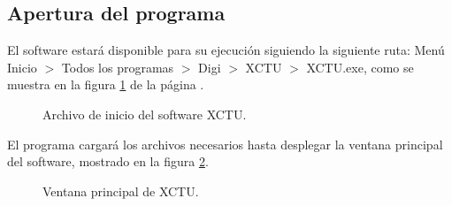 \subsection{Apertura del programa}\label{subsec:exe}

El software estará disponible para su ejecución siguiendo la siguiente ruta: Menú Inicio $>$ Todos los programas $>$ Digi $>$ XCTU $>$ XCTU.exe, como se muestra en la figura \ref{fig:StartXC} de la página \pageref{fig:StartXC}.

\begin{figure}[H] %
\caption{Archivo de inicio del software XCTU.}
\label{fig:StartXC}
\end{figure}

El programa cargará los archivos necesarios hasta desplegar la ventana principal del software, mostrado en la figura \ref{fig:Home}.

\begin{figure}[H] %
\caption{Ventana principal de XCTU.}
\label{fig:Home}
\end{figure}

